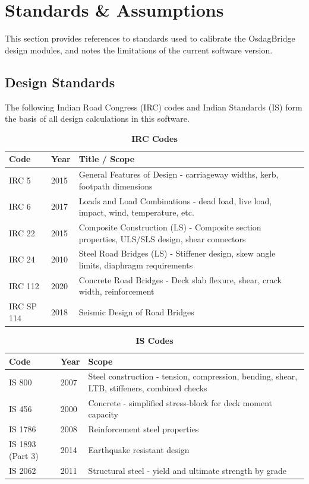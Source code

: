 \documentclass[12pt,a4paper]{report}
\numberwithin{table}{chapter}
\numberwithin{figure}{chapter}
\begin{document}
\chapter{Standards \& Assumptions}
\label{ch:Design Standards}

This section provides references to standards used to calibrate the OsdagBridge
design modules, and notes the limitations of the current software version.

\section{Design Standards}
\label{sec:design_standards}

The following Indian Road Congress (IRC) codes and Indian Standards (IS) 
form the basis of all design calculations in this software.

\vspace{0.5cm}

\begingroup
\setlength{\tabcolsep}{3.5pt}
\begin{table}[H]
\caption{\textbf{IRC Codes}}
\begin{tabular}{|L{2.9cm}|C{1.2cm}|L{10.9cm}|}
\hline
\textbf{Code} & \textbf{Year} & \textbf{Title / Scope} \\ 
\hline
IRC 5 & 2015 & General Features of Design - carriageway widths, kerb, footpath dimensions \\ 
\hline
IRC 6 & 2017 & Loads and Load Combinations - dead load, live load, impact, wind, temperature, etc. \\ 
\hline
IRC 22 & 2015 & Composite Construction (LS) - Composite section properties, ULS/SLS design, shear connectors \\ 
\hline
IRC 24 & 2010 & Steel Road Bridges (LS) - Stiffener design, skew angle limits, diaphragm requirements \\ 
\hline
IRC 112 & 2020 & Concrete Road Bridges - Deck slab flexure, shear, crack width, reinforcement \\ 
\hline
IRC SP 114 & 2018 & Seismic Design of Road Bridges \\ 
\hline
\end{tabular}
\end{table}

\begingroup
\setlength{\tabcolsep}{3.5pt}
\begin{table}[H]
\caption{\textbf{IS Codes}}
\begin{tabular}{|L{2.9cm}|C{1.2cm}|L{10.9cm}|}
\hline
\textbf{Code} & \textbf{Year} & \textbf{Scope} \\
\hline
IS 800 & 2007 & Steel construction - tension, compression, bending, shear, LTB, stiffeners, combined checks \\
\hline
IS 456 & 2000 & Concrete - simplified stress-block for deck moment capacity \\
\hline
IS 1786 & 2008 & Reinforcement steel properties \\
\hline
IS 1893 (Part 3) & 2014 & Earthquake resistant design \\
\hline
IS 2062 & 2011 & Structural steel - yield and ultimate strength by grade \\
\hline
\end{tabular}
\end{table}
\end{document}
